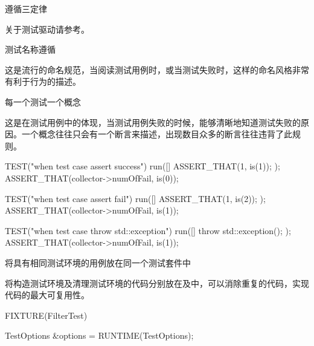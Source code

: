 \begin{content}

\begin{regulation}
遵循三定律
\end{regulation}

\begin{enum}
\end{enum}

关于测试驱动请参考。

\begin{regulation}
测试名称遵循
\end{regulation}

这是流行的命名规范，当阅读测试用例时，或当测试失败时，这样的命名风格非常有利于行为的描述。

\begin{regulation}
每一个测试一个概念
\end{regulation}

这是在测试用例中的体现，当测试用例失败的时候，能够清晰地知道测试失败的原因。一个概念往往只会有一个断言来描述，出现数目众多的断言往往违背了此规则。

\begin{leftbar}
\begin{c++}[caption={\ttfamily{cut/core/TestCaseSpec.cpp}}]
TEST("when test case assert success")
{
    run([] { ASSERT_THAT(1, is(1)); });
    ASSERT_THAT(collector->numOfFail, is(0));
}

TEST("when test case assert fail")
{
    run([] { ASSERT_THAT(1, is(2)); });
    ASSERT_THAT(collector->numOfFail, is(1));
}

TEST("when test case throw std::exception")
{
    run([] { throw std::exception(); });
    ASSERT_THAT(collector->numOfFail, is(1));
}
\end{c++}
\end{leftbar}

\begin{regulation}
将具有相同测试环境的用例放在同一个测试套件中
\end{regulation}

将构造测试环境及清理测试环境的代码分别放在及中，可以消除重复的代码，实现代码的最大可复用性。

\begin{leftbar}
\begin{c++}[caption={\ttfamily{cut/core/TestOptionsSpec.cpp}}]
FIXTURE(FilterTest)
{
    TestOptions &options = RUNTIME(TestOptions);

}
\end{c++}
\end{leftbar}
\end{content}

